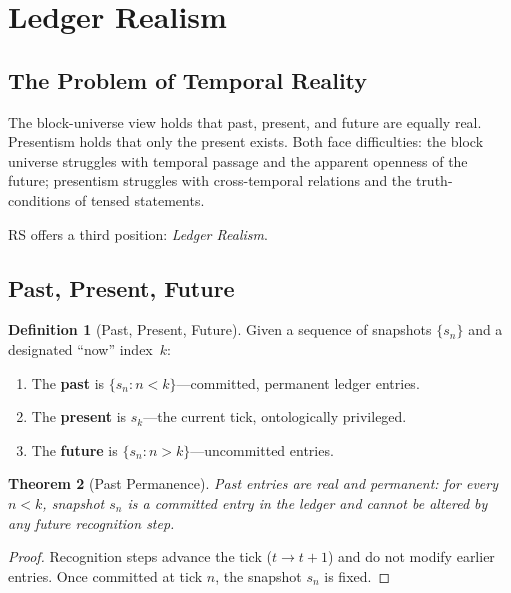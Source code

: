 \documentclass[12pt,a4paper]{article}
\newtheorem{theorem}{Theorem}[section]
\theoremstyle{definition}
\newtheorem{definition}[theorem]{Definition}
\theoremstyle{remark}
\begin{document}
\section{Ledger Realism}
\label{sec:ledger-realism}

\subsection{The Problem of Temporal Reality}

The block-universe view holds that past, present, and future are
equally real.  Presentism holds that only the present exists.  Both
face difficulties: the block universe struggles with temporal passage
and the apparent openness of the future; presentism struggles with
cross-temporal relations and the truth-conditions of tensed statements.

RS offers a third position: \emph{Ledger Realism}.

\subsection{Past, Present, Future}

\begin{definition}[Past, Present, Future]
\label{def:ppf}
Given a sequence of snapshots $\{s_n\}$ and a designated ``now''
index~$k$:
\begin{enumerate}[label=(\alph*),nosep]
  \item The \textbf{past} is $\{s_n : n < k\}$---committed, permanent
  ledger entries.
  \item The \textbf{present} is $s_k$---the current tick, ontologically
  privileged.
  \item The \textbf{future} is $\{s_n : n > k\}$---uncommitted entries.
\end{enumerate}
\end{definition}

\begin{theorem}[Past Permanence]
\label{thm:past-real}
Past entries are real and permanent: for every $n < k$, snapshot $s_n$
is a committed entry in the ledger and cannot be altered by any future
recognition step.
\end{theorem}

\begin{proof}
Recognition steps advance the tick ($t \to t{+}1$) and do not modify
earlier entries.  Once committed at tick $n$, the snapshot $s_n$ is
fixed.
\end{proof}
\end{document}
